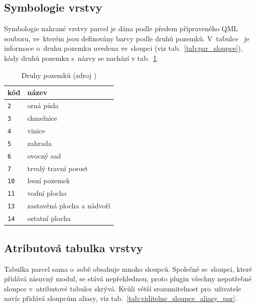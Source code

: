 \subsection{Symbologie vrstvy \texttt{}}
\label{symbologie_par}

Symbologie nahrané vrstvy parcel je dána podle předem připraveného QML souboru, ve~kterém jsou definovány barvy podle druhů pozemků. V~tabulce~\texttt{} je informace o~druhu pozemku uvedena ve~sloupci \texttt{} (viz tab.~\ref{tab:par_sloupce}), kódy druhů pozemku s~názvy se nachází v tab.~\ref{tab:druhy_pozemku}.

\begin{table}[H]
    \begin{tabular}{|l|l|}
        \hline
         kód & název \\
        \hline
        \hline
          \texttt{2} & orná půda \\ \hline
          \texttt{3} & chmelnice \\ \hline          
          \texttt{4} & vinice \\ \hline
          \texttt{5} & zahrada \\ \hline
          \texttt{6} & ovocný sad \\ \hline
          \texttt{7} & trvalý travní porost \\ \hline
          \texttt{10} & lesní pozemek \\ \hline
          \texttt{11} & vodní plocha \\ \hline
          \texttt{13} & zastavěná plocha a nádvoří \\ \hline
          \texttt{14} & ostatní plocha \\
         \hline
    \end{tabular}
    \centering
    \caption[Druhy pozemků]{Druhy pozemků (zdroj \citep{vyhlaska_357})}
    \label{tab:druhy_pozemku}
\end{table}

\newpage

\subsection{Atributová tabulka vrstvy \texttt{}}
\label{tabulka_par}

Tabulka parcel sama o~sobě obsahuje mnoho sloupců. Společně se~sloupci, které přidává zásuvný modul, se stává nepřehlednou, proto plugin všechny nepotřebné sloupce v~atributové tabulce skrývá. Kvůli větší srozumitelnost pro~uživatele navíc přidává sloupcům aliasy, viz tab.~\ref{tab:viditelne_sloupce_aliasy_par}.

